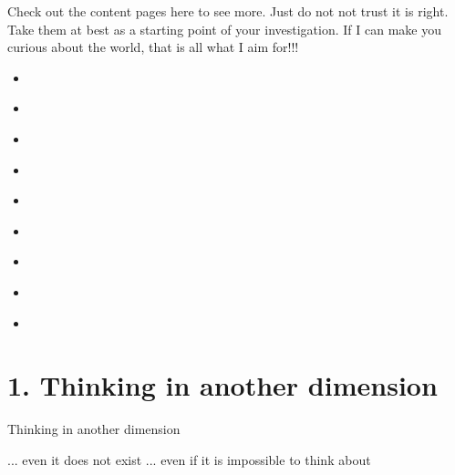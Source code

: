 \documentclass[letterpaper,10pt,english]{jupyterBook}
\begin{document}
\sphinxAtStartPar
Check out the content pages here to see more.  Just do not not trust it is right.  Take them at best as a starting point of your investigation. If I can make you curious about the world, that is all what I aim for!!!
\begin{itemize}
\item {} 
\sphinxAtStartPar
{\hyperref[\detokenize{MacTwgssA1-think::doc}]{}}

\item {} 
\sphinxAtStartPar
{\hyperref[\detokenize{MacTwgssA2-zero::doc}]{}}

\item {} 
\sphinxAtStartPar
{\hyperref[\detokenize{MacTwgssA3-imgNo::doc}]{}}

\item {} 
\sphinxAtStartPar
{\hyperref[\detokenize{MacTwgssA4-splitImgNo::doc}]{}}

\item {} 
\sphinxAtStartPar
{\hyperref[\detokenize{MacTwgssAx-App::doc}]{}}

\item {} 
\sphinxAtStartPar
{\hyperref[\detokenize{intro::doc}]{}}

\item {} 
\sphinxAtStartPar
{\hyperref[\detokenize{markdown::doc}]{}}

\item {} 
\sphinxAtStartPar
{\hyperref[\detokenize{notebooks::doc}]{}}

\item {} 
\sphinxAtStartPar
{\hyperref[\detokenize{markdown-notebooks::doc}]{}}

\end{itemize}

\sphinxstepscope


\chapter{1. Thinking in another dimension}
\label{\detokenize{MacTwgssA1-think:thinking-in-another-dimension}}\label{\detokenize{MacTwgssA1-think::doc}}
\begin{sphinxVerbatim}[commandchars=\\\{\}]
Thinking in another dimension

... even it does not exist
... even if it is impossible to think about
\end{sphinxVerbatim}
\end{document}
